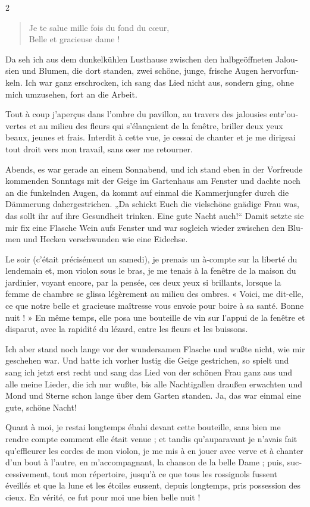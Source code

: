 \documentclass[a4paper,11pt]{article}
\newcommand\chunks[2]{%
\begin{leftcolumn*}\begin{otherlanguage}{german}%
{#1}%
\end{otherlanguage}\end{leftcolumn*}%
\begin{rightcolumn}\begin{otherlanguage}{french}%
{#2}%
\end{otherlanguage}\end{rightcolumn}%
}
\begin{document}
\begin{paracol}{2}
{\begin{verse}
Je te salue mille fois du fond du cœur,\\
Belle et gracieuse dame !
\end{verse}}
  \chunks{Da seh ich aus dem dunkelkühlen Lusthause zwischen den halbgeöffneten Jalousien und Blumen, die dort standen, zwei schöne, junge, frische Augen hervorfunkeln. Ich war ganz erschrocken, ich sang das Lied nicht aus, sondern ging, ohne mich umzusehen, fort an die Arbeit.}
         {Tout à coup j’aperçus dans l’ombre du pavillon, au travers des jalousies entr’ouvertes et au milieu des fleurs qui s’élançaient de la fenêtre, briller deux yeux beaux, jeunes et frais. Interdit à cette vue, je cessai de chanter et je me dirigeai tout droit vers mon travail, sans oser me retourner.}
  \chunks{Abends, es war gerade an einem Sonnabend, und ich stand eben in der Vorfreude kommenden Sonntags mit der Geige im Gartenhaus am Fenster und dachte noch an die funkelnden Augen, da kommt auf einmal die Kammerjungfer durch die Dämmerung dahergestrichen. „Da schickt Euch die vielschöne gnädige Frau was, das sollt ihr auf ihre Gesundheit trinken. Eine gute Nacht auch!“ Damit setzte sie mir fix eine Flasche Wein aufs Fenster und war sogleich wieder zwischen den Blumen und Hecken verschwunden wie eine Eidechse.}
         {Le soir (c’était précisément un samedi), je prenais un à-compte sur la liberté du lendemain et, mon violon sous le bras, je me tenais à la fenêtre de la maison du jardinier, voyant encore, par la pensée, ces deux yeux si brillants, lorsque la femme de chambre se glissa légèrement au milieu des ombres. « Voici, me dit-elle, ce que notre belle et gracieuse maîtresse vous envoie pour boire à sa santé. Bonne nuit ! » En même temps, elle posa une bouteille de vin sur l’appui de la fenêtre et disparut, avec la rapidité du lézard, entre les fleurs et les buissons.}
  \chunks{Ich aber stand noch lange vor der wundersamen Flasche und wußte nicht, wie mir geschehen war. Und hatte ich vorher lustig die Geige gestrichen, so spielt und sang ich jetzt erst recht und sang das Lied von der schönen Frau ganz aus und alle meine Lieder, die ich nur wußte, bis alle Nachtigallen draußen erwachten und Mond und Sterne schon lange über dem Garten standen. Ja, das war einmal eine gute, schöne Nacht!}
         {Quant à moi, je restai longtemps ébahi devant cette bouteille, sans bien me rendre compte comment elle était venue ; et tandis qu’auparavant je n’avais fait qu’effleurer les cordes de mon violon, je me mis à en jouer avec verve et à chanter d’un bout à l’autre, en m’accompagnant, la chanson de la belle Dame ; puis, successivement, tout mon répertoire, jusqu’à ce que tous les rossignols fussent éveillés et que la lune et les étoiles eussent, depuis longtemps, pris possession des cieux. En vérité, ce fut pour moi une bien belle nuit !}

\end{paracol}
\end{document}
